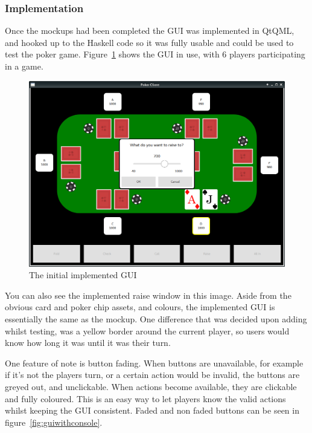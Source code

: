 \subsubsection{Implementation}

Once the mockups had been completed the GUI was implemented in QtQML,
and hooked up to the Haskell code so it was fully usable and could be used
to test the poker game. Figure~\ref{fig:actualgui} shows the GUI in use,
with 6 players participating in a game. 

\begin{figure}[H]
    \centering
    \includegraphics[width=\textwidth]{../images/actualgui.png}
    \caption{The initial implemented GUI}%
    \label{fig:actualgui}
\end{figure}

You can also see the implemented raise window in this image. Aside from the 
obvious card and poker chip assets, and colours, the implemented GUI is 
essentially the same as the mockup. One difference that was decided upon 
adding whilst testing, was a yellow border around the current player, so users 
would know how long it was until it was their turn. 

One feature of note is button fading. When buttons are unavailable, for
example if it's not the players turn, or a certain action would be invalid,
the buttons are greyed out, and unclickable. When actions become available,
they are clickable and fully coloured. This is an easy way to let players
know the valid actions whilst keeping the GUI consistent. Faded and non faded
buttons can be seen in figure~\ref{fig:guiwithconsole}.

